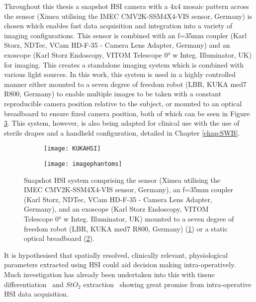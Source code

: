 Throughout this thesis a snapshot HSI camera with a 4x4 mosaic pattern across the sensor (Ximea utilising the IMEC CMV2K-SSM4X4-VIS sensor, Germany) is chosen which enables fast data acquisition and integration into a variety of imaging configurations. This sensor is combined with an f=35mm coupler (Karl Storz, NDTec, VCam HD-F-35 - Camera Lens Adapter, Germany) and an exoscope (Karl Storz Endoscopy, VITOM Telescope 0° w Integ. Illuminator, UK) for imaging. This creates a standalone imaging system which is combined with various light sources. In this work, this system is used in a highly controlled manner either mounted to a seven degree of freedom robot (LBR, KUKA med7 R800, Germany) to enable multiple images to be taken with a constant reproducible camera position relative to the subject, or mounted to an optical breadboard to ensure fixed camera position, both of which can be seen in Figure \ref{fig:HSIsetups}. This system, however, is also being adapted for clinical use with the use of sterile drapes and a handheld configuration, detailed in Chapter \ref{chap:SWB}. %
\begin{figure}[h]
    \centering 
    \begin{subfigure}[ht!]{0.27\textwidth}
	\texttt{[image: KUKAHSI]}
	\caption{}
	\label{fig:KUKAHSI}
    \end{subfigure}
    \begin{subfigure}[ht!]{0.17\textwidth}
        \texttt{[image: imagephantoms]}
        \caption{}
        \label{fig:ScopeHSI}
    \end{subfigure}
    \caption{Snapshot HSI system comprising the sensor (Ximea utilising the IMEC CMV2K-SSM4X4-VIS sensor, Germany), an f=35mm coupler (Karl Storz, NDTec, VCam HD-F-35 - Camera Lens Adapter, Germany), and an exoscope (Karl Storz Endoscopy, VITOM Telescope 0° w Integ. Illuminator, UK) mounted to a seven degree of freedom robot (LBR, KUKA med7 R800, Germany) (\ref{fig:KUKAHSI}) or a static optical breadboard (\ref{fig:ScopeHSI}).}
    \label{fig:HSIsetups}
\end{figure}
%
It is hypothesised that spatially resolved, clinically relevant, physiological parameters extracted using HSI could aid decision making intra-operatively. Much investigation has already been undertaken into this with tissue differentiation~\cite{Kabwama2016, Fabelo2019, Kho2019, Giannantonio2023} and $StO_2$ extraction~\cite{Yudovsky2015, Clancy2015, WOS:000360241100026, Wirkert2016, Clancy2020, Thoenissen2023} showing great promise from intra-operative HSI data acquisition. 


